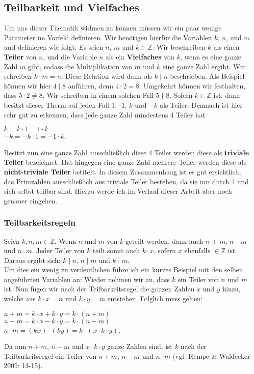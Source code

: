 \documentclass[german,12pt,a4paper]{article}
\begin{document}
\subsection{Teilbarkeit und Vielfaches}
Um uns dieser Thematik widmen zu können müssen wir ein paar wenige Parameter im Vorfeld definieren.\newline
Wir benötigen hierfür die Variablen $k$, $n$, und $m$ und definieren wie folgt:\newline
Es seien $n$, $m$ und $k \in \mathbb{Z}$. Wir beschreiben $k$ als einen \textbf{Teiler} von $n$, und die Variable $n$ als ein \textbf{Vielfaches} von $k$, wenn es eine ganze Zahl $m$ gibt, sodass die Multiplikation von $m$ und $k$ eine ganze Zahl ergibt. Wir schreiben $k\cdot{m} = n$. Diese Relation wird dann als $k \mid n$ beschrieben.\newline
Als Beispiel können wir hier $4 \mid 8$ anführen, denn $4 \cdot 2 = 8$. Umgekehrt können wir festhalten, dass $5 \cdot 2 \neq 8$. 
Wir schreiben in einem solchen Fall $5 \nmid 8$.\newline
Sofern $k \in \mathbb{Z}$ ist, dann besitzt dieser Therm auf jeden Fall 1, -1, $k$ und $-k$ als Teiler. Demnach ist hier sehr gut zu erkennen, dass jede ganze Zahl mindestens 4 Teiler hat
\begin{center}
$k = k \cdot 1 = 1 \cdot k$\\
$-k = -k \cdot 1 = -1 \cdot k$.
\end{center}
Besitzt nun eine ganze Zahl ausschließlich diese 4 Teiler werden diese als \textbf{triviale Teiler} bezeichnet. Hat hingegen eine ganze Zahl mehrere Teiler werden diese als \textbf{nicht-triviale Teiler} betitelt. In diesem Zusammenhang ist es gut ersichtlich, das Primzahlen ausschließlich aus triviale Teiler bestehen, da sie nur durch 1 und sich selbst teilbar sind. Hierzu werde ich im Verlauf dieser Arbeit aber noch genauer eingehen.

\subsubsection{Teilbarkeitsregeln}
Seien $k, n, m \in \mathbb{Z}$. Wenn $n$ und $m$ von $k$ geteilt werden, dann auch $n$ + $m$,\newline
$n$ - $m$ und $n\cdot m$. Jeder Teiler von $k$ teilt somit auch $k \cdot x$, sofern $x$ ebenfalls $\in \mathbb{Z}$ ist. Daraus ergibt sich: $k \mid n$, $n \mid m$ und $k \mid m$.\\
Um dies ein wenig zu verdeutlichen führe ich ein kurzes Beispiel mit den selben angeführten Variablen an: Wieder nehmen wir an, dass $k$ ein Teiler von $n$ und $m$ ist. Nun fügen wir nach der Teilbarkeitsregel die ganzen Zahlen $x$ und $y$ hinzu, welche aus $k \cdot x = n$ und $k \cdot y = m$ entstehen. Folglich muss gelten:
\begin{center}
$n + m = k \cdot x + k \cdot y = k \cdot (n + m)$\\
$n - m = k \cdot x - k \cdot y = k \cdot (n - m)$\\
$n \cdot m = (kx) \cdot (ky) = k \cdot (x \cdot k \cdot y)$.
\end{center}
Da nun $n + m$, $n - m$ und $x \cdot k \cdot y$ ganze Zahlen sind, ist $k$ nach der Teilbarkeitsregel ein Teiler von $n + m$, $n - m$ und $n \cdot m$ (vgl. Rempe \& Waldecker 2009: 13-15).
\end{document}
